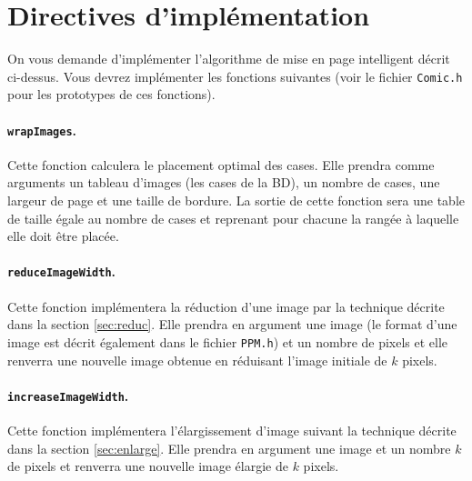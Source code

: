 \documentclass[a4paper,10pt]{article}
\begin{document}
\section{Directives d'implémentation}

On vous demande d'implémenter l'algorithme de mise en page intelligent
décrit ci-dessus. Vous devrez implémenter les fonctions suivantes
(voir le fichier \texttt{Comic.h} pour les prototypes de ces
fonctions).

\paragraph{\texttt{wrapImages}.} Cette fonction calculera le placement optimal
des cases. Elle prendra comme arguments un tableau d'images (les cases de la
BD), un nombre de cases, une largeur de page et une taille de bordure. La
sortie de cette fonction sera une table de taille égale au nombre de cases et
reprenant pour chacune la rangée à laquelle elle doit être placée.

\paragraph{\texttt{reduceImageWidth}.} Cette fonction implémentera la réduction
d'une image par la technique décrite dans la section \ref{sec:reduc}. Elle
prendra en argument une image (le format d'une image est décrit également dans
le fichier \texttt{PPM.h}) et un nombre de pixels et elle renverra une nouvelle
image obtenue en réduisant l'image initiale de $k$ pixels.


\paragraph{\texttt{increaseImageWidth}.} Cette fonction implémentera
l'élargissement d'image suivant la technique décrite dans la section
\ref{sec:enlarge}. Elle prendra en argument une image et un nombre $k$ de
pixels et renverra une nouvelle image élargie de $k$ pixels.
\end{document}

